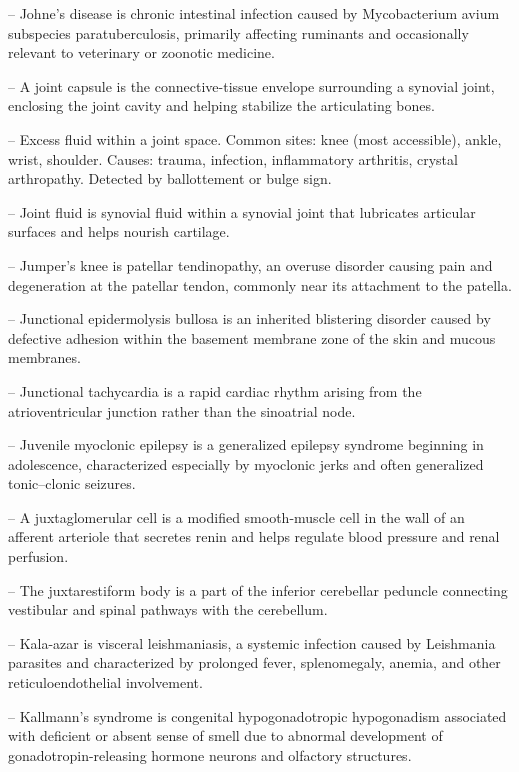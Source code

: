 -- Johne's disease is chronic intestinal infection caused by Mycobacterium avium subspecies paratuberculosis, primarily affecting ruminants and occasionally relevant to veterinary or zoonotic medicine.

-- A joint capsule is the connective-tissue envelope surrounding a synovial joint, enclosing the joint cavity and helping stabilize the articulating bones.

-- Excess fluid within a joint space. Common sites: knee (most accessible), ankle, wrist, shoulder. Causes: trauma, infection, inflammatory arthritis, crystal arthropathy. Detected by ballottement or bulge sign.

-- Joint fluid is synovial fluid within a synovial joint that lubricates articular surfaces and helps nourish cartilage.

-- Jumper's knee is patellar tendinopathy, an overuse disorder causing pain and degeneration at the patellar tendon, commonly near its attachment to the patella.

-- Junctional epidermolysis bullosa is an inherited blistering disorder caused by defective adhesion within the basement membrane zone of the skin and mucous membranes.

-- Junctional tachycardia is a rapid cardiac rhythm arising from the atrioventricular junction rather than the sinoatrial node.

-- Juvenile myoclonic epilepsy is a generalized epilepsy syndrome beginning in adolescence, characterized especially by myoclonic jerks and often generalized tonic--clonic seizures.

-- A juxtaglomerular cell is a modified smooth-muscle cell in the wall of an afferent arteriole that secretes renin and helps regulate blood pressure and renal perfusion.

-- The juxtarestiform body is a part of the inferior cerebellar peduncle connecting vestibular and spinal pathways with the cerebellum.

-- Kala-azar is visceral leishmaniasis, a systemic infection caused by Leishmania parasites and characterized by prolonged fever, splenomegaly, anemia, and other reticuloendothelial involvement.

-- Kallmann's syndrome is congenital hypogonadotropic hypogonadism associated with deficient or absent sense of smell due to abnormal development of gonadotropin-releasing hormone neurons and olfactory structures.

